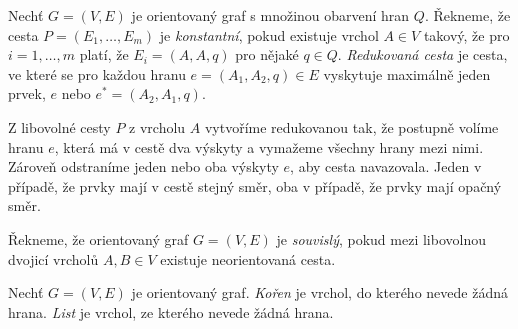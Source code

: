 \begin{definice}
    Nechť $G = (V, E)$ je orientovaný graf s množinou obarvení hran $Q$. Řekneme, že cesta $P = (E_1, \dots, E_m)$
    je \emph{konstantní}, pokud existuje vrchol $A \in V$ takový, že pro $i = 1,\dots,m $ platí, že $E_i = (A,A,q)$ pro nějaké $q \in Q$. 
    \emph{Redukovaná cesta} je cesta, ve které se pro každou hranu $e = (A_1, A_2, q) \in E$ vyskytuje maximálně jeden prvek, $e$ nebo $e^* = (A_2, A_1, q)$.
\end{definice}
\begin{pozn}\label{pozn-redukce-cesty}
    Z libovolné cesty $P$ z vrcholu $A$ vytvoříme redukovanou tak, že postupně volíme hranu $e$, která má v cestě dva  výskyty a vymažeme všechny hrany mezi nimi. Zároveň odstraníme jeden nebo oba  výskyty $e$, aby cesta navazovala. Jeden v případě, že prvky mají v cestě stejný směr, oba v případě, že prvky mají opačný směr.
    
\end{pozn}
    


\begin{definice}
    Řekneme, že orientovaný graf $G=(V,E)$ je \emph{souvislý}, pokud mezi libovolnou dvojicí vrcholů $A, B \in V$ existuje neorientovaná cesta.
\end{definice}

\begin{definice}
    Nechť $G = (V, E)$ je orientovaný graf. \emph{Kořen} je vrchol, do kterého nevede žádná hrana. \emph{List} je vrchol, ze kterého nevede žádná hrana.
\end{definice}

